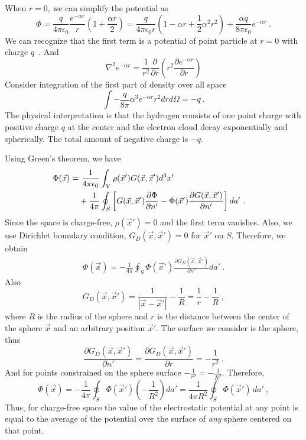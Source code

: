 \documentclass[12pt]{article}
\begin{document}
When $r = 0$, we can simplify the potential as
\begin{equation}
    \Phi = \frac{q}{4\pi \epsilon_0}\frac{e^{-\alpha r}}{r} \left( 1+ \frac{\alpha r}{2} \right) = \frac{q}{4\pi \epsilon_0 r} \left(1 - \alpha r + \frac12 \alpha^2 r^2 \right) + \frac{\alpha q}{8 \pi \epsilon_0} e^{-\alpha r}~.
\end{equation}
We can recognize that the first term is a potential of point particle at $r = 0$ with charge $q$~. And
\begin{equation}
    \nabla^2 e^{-\alpha r} = \frac{1}{r^2} \frac{\partial}{\partial r} \left(r^2 \frac{\partial e^{-\alpha r}}{\partial r}\right)
\end{equation}
\fi
Consider integration of the first part of density over all space
\begin{equation}
    \int -\frac{q}{8 \pi} \alpha^3 e^{-\alpha r} r^2 dr d\Omega = -q~.
\end{equation}
The physical interpretation is that the hydrogen consists of one point charge with positive charge $q$ at the center and the electron cloud decay exponentially and spherically. The total amount of negative charge is $-q$.

\newpage
{} Using Green's theorem, we have
\begin{align}
    \Phi(\vec x) = & ~ \frac{1}{4 \pi \epsilon_0 } \int_V \rho(\vec x') G(\vec x, \vec x') d^3 x' \cr
    &+ \frac{1}{4\pi} \oint_S \left[ G(\vec x, \vec x') \frac{\partial \Phi}{\partial n'} - \Phi(\vec x') \frac{\partial G(\vec x, \vec x')}{\partial n'} \right] da'~.
\end{align}
Since the space is charge-free, $\rho(\vec x') = 0$ and the first term vanishes. Also, we use Dirichlet boundary condition, $G_D(\vec x, \vec x') = 0$ for $\vec x'$ on $S$. Therefore, we obtain
\begin{align}
    \Phi(\vec x) = - \frac{1}{4\pi} \oint_S\Phi(\vec x')\frac{\partial G_D(\vec x, \vec x')}{\partial n'} da'~.
\end{align}
Also
\begin{equation}
    G_D(\vec x, \vec x') = \frac{1}{|\vec x - \vec x'|} - \frac{1}{R} = \frac{1}{r} - \frac{1}{R}~,
\end{equation}
where $R$ is the radius of the sphere and $r$ is the distance between the center of the sphere $\vec x$ and an arbitrary position $\vec x'$. The surface we consider is the sphere, thus
\begin{equation}
    \frac{\partial G_D (\vec x, \vec x') }{\partial n' } = \frac{\partial G_D(\vec x, \vec x')}{\partial r} = -\frac{1}{r^2}~.
\end{equation}
And for points constrained on the sphere surface $-\frac{1}{r^2} = - \frac{1}{R^2}$. Therefore,
\begin{equation}
    \Phi(\vec x) = -\frac{1}{4 \pi} \oint_S \Phi(\vec x')\left( - \frac{1}{R^2} \right) da' = \frac{1}{4\pi R^2} \oint_S \Phi(\vec x') \, da'~,
\end{equation}
Thus, for charge-free space the value of the electrostatic potential at any point is equal to the average of the potential over the surface of \textit{any} sphere centered on that point.
\end{document}
